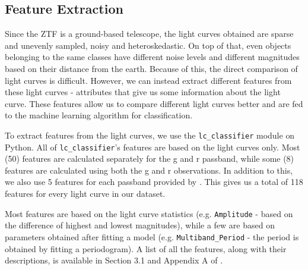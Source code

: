 \documentclass[conference]{IEEEtran}
\begin{document}
\subsection{Feature Extraction} \label{subsec:feature_extraction}
Since the ZTF is a ground-based telescope, the light curves obtained are sparse and unevenly sampled, noisy and heteroskedastic. On top of that, even objects belonging to the same classes have different noise levels and different magnitudes based on their distance from the earth. Because of this, the direct comparison of light curves is difficult. However, we can instead extract different features from these light curves - attributes that give us some information about the light curve. These features allow us to compare different light curves better and are fed to the machine learning algorithm for classification.


To extract features from the light curves, we use the \texttt{lc\_classifier} module \cite{jainagaAlercebrokerLcClassifier2021} on Python. All of \texttt{lc\_classifier}'s features are based on the light curves only. Most (50) features are calculated separately for the g and r passband, while some (8) features are calculated using both the g and r observations. In addition to this, we also use 5 features for each passband provided by \cite{chenZwickyTransientFacility2020a}. This gives us a total of 118 features for every light curve in our dataset.

Most features are based on the light curve statistics (e.g. \texttt{Amplitude} - based on the difference of highest and lowest magnitudes), while a few are based on parameters obtained after fitting a model (e.g. \texttt{Multiband\_Period} - the period is obtained by fitting a periodogram). A list of all the features, along with their descriptions, is
available in Section 3.1 and Appendix A of \cite{sanchez-saezAlertClassificationALeRCE2021}.
\end{document}
